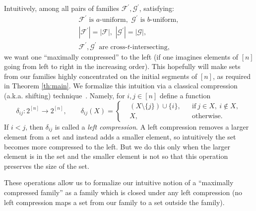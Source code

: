 \documentclass[12pt]{article}
\def\sm{\setminus}
\def\F{{\mathcal F}}
\def\G{{\mathcal G}}
\def\sm{\setminus}
\begin{document}
Intuitively, among all pairs of families $\F^\prime, \G^\prime$, satisfying:
\begin{align}
\label{cond1}
\F^\prime \mbox{ is $a$-uniform},\,\, \G^\prime \mbox{ is $b$-uniform}, \\
\label{cond2}
|\F^\prime| = |\F|,\,\, |\G^\prime| = |\G|, \\
\label{cond3}
\F^\prime, \G^\prime \mbox{ are cross-$t$-intersecting},
\end{align}
we want one ``maximally compressed''  to the left (if one imagines elements of $[n]$ going from left to right in the increasing order). This hopefully will make sets from our families highly concentrated on the initial segments of $[n]$, as required in Theorem \ref{th:main}. We formalize this intuition via a classical compression (a.k.a. shifting) technique~\cite{Frankl87}. Namely, for $i, j\in [n]$ define a function
$$\delta_{ij} \colon 2^{[n]}\to 2^{[n]}, \qquad \delta_{ij}(X) = \left\{
\begin{aligned}
  &(X\sm\{j\})\cup\{i\}, &&\text{if}\ j\in X,\ i\notin X,\\
  &X, &&\text{otherwise.}
\end{aligned}\right.$$
If $i < j$, then $\delta_{ij}$ is called a \emph{left compression}. A left compression removes a larger element from a set and instead adds a smaller element, so intuitively the set becomes more compressed to the left. But we do this only when the larger element is in the set and the smaller element is not so that this operation  preserves the size of the set.


These operations allow us to formalize our intuitive notion of a ``maximally compressed family'' as a family which is closed under any left compression (no left compression maps a set from our family to a set outside the family).
\end{document}
